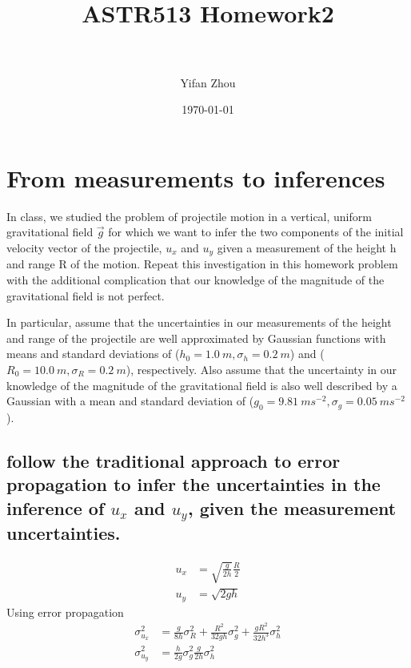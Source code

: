 \documentclass[paper=letter, fontsize=11pt]{scrartcl} %
\title{ 
  \normalfont \normalsize 
  \textsc{} \\ [25pt] %
  \horrule{0.5pt} \\ [0.4cm] %
  \huge ASTR513 Homework2 \\ %
  \horrule{2pt} \\ [0.5cm] %
}
\author{Yifan Zhou} %
\date{\normalsize\today} %
\begin{document}
\maketitle %

\section{From measurements to inferences}
In class, we studied the problem of projectile motion in a vertical,
uniform gravitational field $\vec{g}$ for which we want to infer the two
components of the initial velocity vector of the projectile, $u_{x}$ and $u_{y}$
given a measurement of the height h and range R of the motion. Repeat
this investigation in this homework problem with the additional
complication that our knowledge of the magnitude of the gravitational
field is not perfect.

In particular, assume that the uncertainties in our measurements of
the height and range of the projectile are well approximated by
Gaussian functions with means and standard deviations of
($h_{0} = \SI{1.0}{m}, \sigma_{h} = \SI{0.2}{m}$) and
($R_{0} = \SI{10.0}{m}, \sigma_{R} = \SI{0.2}{m}$), respectively. Also
assume that the uncertainty in our knowledge of the magnitude of the
gravitational field is also well described by a Gaussian with a mean
and standard deviation of
($g_{0} = \SI{9.81} {m s^{-2}}, \sigma_{g} = \SI{0.05}{m s^{-2}}$).

\subsection{follow the traditional approach to error propagation to
  infer the uncertainties in the inference of $u_{x}$ and $u_{y}$, given the
  measurement uncertainties.}

\begin{align}
u_x &= \sqrt{\frac{g}{2h}}\frac{R}{2}\\
u_y &= \sqrt{2gh}
\end{align}
Using error propagation
\newcommand{\dd}{\ensuremath{\mathrm{d}}}
\newcommand{\ddfrac}[2]{\ensuremath{\frac{\mathrm{d} #1}{\mathrm{d} #2}}}
\newcommand{\ppfrac}[2]{\ensuremath{\frac{\partial #1}{\partial #2}}}
\begin{align}
  \sigma_{u_{x}}^{2} &=\frac{g}{8h} \sigma_{R}^{2} +
                       \frac{R^{2}}{32gh}\sigma_{g}^{2} +
                       \frac{gR^{2}}{32h^{3}} \sigma_{h}^{2} \\
  \sigma_{u_{y}}^{2} &= \frac{h}{2g} \sigma_{g}^{2}  \frac{g}{2h} \sigma_{h}^{2}
\end{align}
\end{document}
